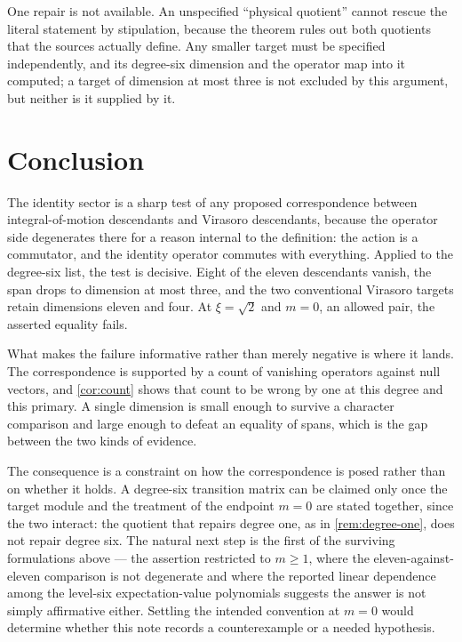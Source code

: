 \documentclass[11pt,reqno]{amsart}
\theoremstyle{plain}
\theoremstyle{definition}
\theoremstyle{remark}
\numberwithin{equation}{section}
\begin{document}
One repair is not available. An unspecified ``physical quotient'' cannot
rescue the literal statement by stipulation, because the theorem rules out
both quotients that the sources actually define. Any smaller target must be
specified independently, and its degree-six dimension and the operator map
into it computed; a target of dimension at most three is not excluded by this
argument, but neither is it supplied by it.

\section{Conclusion}
\label{sec:conclusion}

The identity sector is a sharp test of any proposed correspondence between
integral-of-motion descendants and Virasoro descendants, because the operator
side degenerates there for a reason internal to the definition: the action is
a commutator, and the identity operator commutes with everything. Applied to
the degree-six list, the test is decisive. Eight of the eleven descendants
vanish, the span drops to dimension at most three, and the two conventional
Virasoro targets retain dimensions eleven and four. At $\xi=\sqrt2$ and
$m=0$, an allowed pair, the asserted equality fails.

What makes the failure informative rather than merely negative is where it
lands. The correspondence is supported by a count of vanishing operators
against null vectors, and \cref{cor:count} shows that count to be wrong by one
at this degree and this primary. A single dimension is small enough to survive
a character comparison and large enough to defeat an equality of spans, which
is the gap between the two kinds of evidence.

The consequence is a constraint on how the correspondence is posed rather
than on whether it holds. A degree-six transition matrix can be claimed only
once the target module and the treatment of the endpoint $m=0$ are stated
together, since the two interact: the quotient that repairs degree one, as in
\cref{rem:degree-one}, does not repair degree six. The natural next step is
the first of the surviving formulations above --- the assertion restricted to
$m\ge1$, where the eleven-against-eleven comparison is not degenerate and
where the reported linear dependence among the level-six expectation-value
polynomials \cite{Boos_2018nr} suggests the answer is not simply affirmative
either. Settling the intended convention at $m=0$ would determine whether
this note records a counterexample or a needed hypothesis.
\end{document}
